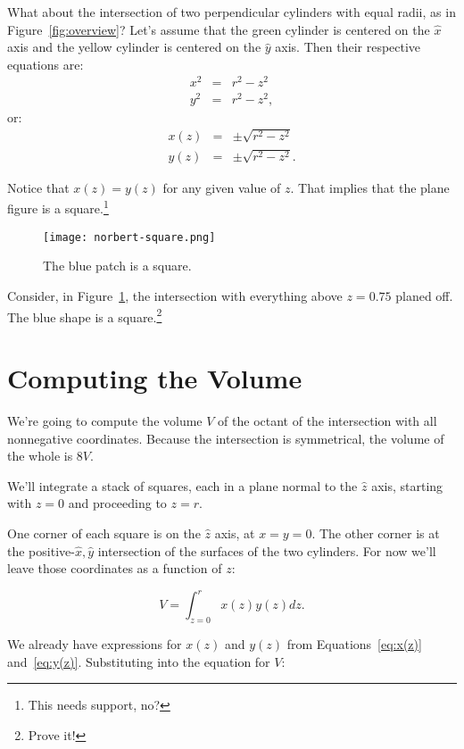 \documentclass[twocolumn]{article}
\theoremstyle{definition}
\theoremstyle{plain}
\begin{document}
What about the intersection of two perpendicular cylinders with equal
radii, as in Figure~\ref{fig:overview}?  Let's assume that the green
cylinder is centered on the $\hat{x}$ axis and the yellow cylinder is
centered on the $\hat{y}$ axis.  Then their respective equations are:
\begin{eqnarray*}
  x^2 & = & r^2 - z^2 \\
  y^2 & = & r^2 - z^2,
\end{eqnarray*}
or:
\begin{eqnarray}
  x(z) & = & \pm \sqrt{r^2 - z^2} \label{eq:x(z)} \\
  y(z) & = & \pm \sqrt{r^2 - z^2}. \label{eq:y(z)}
\end{eqnarray}

Notice that $x(z) = y(z)$ for any given value of $z$.  That implies
that the plane figure is a square.\footnote{This needs support, no?}

\begin{figure}
  \texttt{[image: norbert-square.png]}
  \caption{The blue patch is a square.}
  \label{fig:square}
\end{figure}

Consider, in Figure~\ref{fig:square}, the intersection with everything
above $z=0.75$ planed off.  The blue shape is a square.\footnote{Prove it!}

\section{Computing the Volume}
\label{sec:computing}

We're going to compute the volume $V$ of the octant of the
intersection with all nonnegative coordinates.  Because the
intersection is symmetrical, the volume of the whole is $8V$.

We'll integrate a stack of squares, each in a plane normal to the
$\hat{z}$ axis, starting with $z=0$ and proceeding to $z=r$.

One corner of each square is on the $\hat{z}$ axis, at $x=y=0$.  The
other corner is at the positive-$\hat{x},\hat{y}$ intersection of the
surfaces of the two cylinders.  For now we'll leave those coordinates
as a function of $z$:

\begin{equation*}
  V = \int_{z=0}^r x(z) y(z) dz.
\end{equation*}

We already have expressions for $x(z)$ and $y(z)$ from
Equations~\ref{eq:x(z)} and~\ref{eq:y(z)}.  Substituting into the
equation for $V$:
\end{document}
